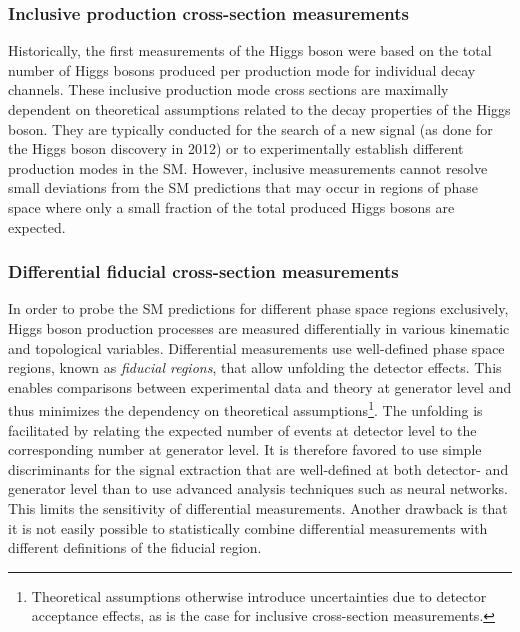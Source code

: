 \subsubsection{Inclusive production cross-section measurements}
Historically, the first measurements of the Higgs boson were based on the total number of Higgs bosons produced per production mode for individual decay channels.
These inclusive production mode cross sections are maximally dependent on theoretical assumptions related to the decay properties of the Higgs boson.
They are typically conducted for the search of a new signal (as done for the Higgs boson discovery in 2012) or to experimentally establish different production modes in the SM.
However, inclusive measurements cannot resolve small deviations from the SM predictions that may occur in regions of phase space where only a small fraction of the total produced Higgs bosons are expected.

\subsubsection{Differential fiducial cross-section measurements}
In order to probe the SM predictions for different phase space regions exclusively, Higgs boson production processes are measured differentially in various kinematic and topological variables.
Differential measurements use well-defined phase space regions, known as \emph{fiducial regions}, that allow unfolding the detector effects. 
This enables comparisons between experimental data and theory at generator level and thus minimizes the dependency on theoretical assumptions\footnote{Theoretical assumptions otherwise introduce uncertainties due to detector acceptance effects, as is the case for inclusive cross-section measurements.}.
The unfolding is facilitated by relating the expected number of events at detector level to the corresponding number at generator level. It is therefore favored to use simple discriminants for the signal extraction that are well-defined at both detector- and generator level than to use advanced analysis techniques such as neural networks. 
This limits the sensitivity of differential measurements.
Another drawback is that it is not easily possible to statistically combine differential measurements with different definitions of the fiducial region.  

